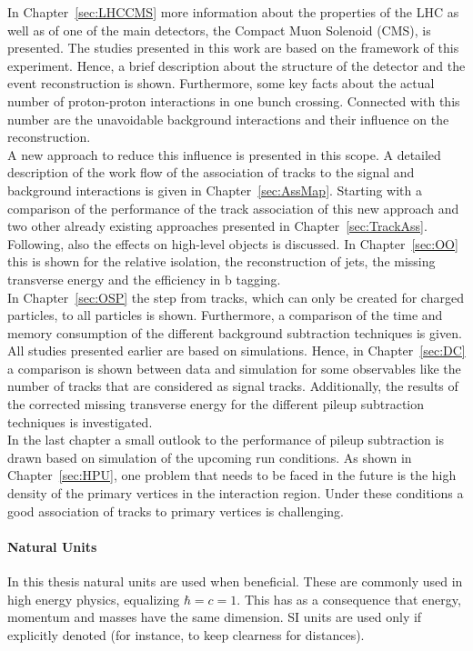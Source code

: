 In Chapter~\ref{sec:LHCCMS} more information about the properties of the LHC as well as of one of the main detectors, the Compact Muon Solenoid (CMS), is presented. The studies presented in this work are based on the framework of this experiment. Hence, a brief description about the structure of the detector and the event reconstruction is shown. Furthermore, some key facts about the actual number of proton-proton interactions in one bunch crossing. Connected with this number are the unavoidable background interactions and their influence on the reconstruction. \\
A new approach to reduce this influence is presented in this scope. A detailed description of the work flow of the association of tracks to the signal and background interactions is given in Chapter~\ref{sec:AssMap}. Starting with a comparison of the performance of the track association of this new approach and two other already existing approaches presented in Chapter~\ref{sec:TrackAss}. Following, also the effects on high-level objects is discussed. In Chapter~\ref{sec:OO} this is shown for the relative isolation, the reconstruction of jets, the missing transverse energy and the efficiency in b tagging. \\
In Chapter~\ref{sec:OSP} the step from tracks, which can only be created for charged particles, to all particles is shown. Furthermore, a comparison of the time and memory consumption of the different background subtraction techniques is given. \\
All studies presented earlier are based on simulations. Hence, in Chapter~\ref{sec:DC} a comparison is shown between data and simulation for some observables like the number of tracks that are considered as signal tracks. Additionally, the results of the corrected missing transverse energy for the different pileup subtraction techniques is investigated. \\
In the last chapter a small outlook to the performance of pileup subtraction is drawn based on simulation of the upcoming run conditions. As shown in Chapter~\ref{sec:HPU}, one problem that needs to be faced in the future is the high density of the primary vertices in the interaction region. Under these conditions a good association of tracks to primary vertices is challenging.

\paragraph*{Natural Units}

In this thesis natural units are used when beneficial. These are commonly used in high energy physics, equalizing $\hbar{} = c = 1$. This has as a consequence that energy, momentum and masses have the same dimension. SI units are used only if explicitly denoted (for instance, to keep clearness for distances).
